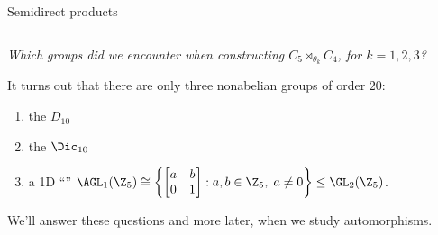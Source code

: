\documentclass[8pt, handout]{beamer}
\newcommand{\Pause}{}
\begin{document}
\begin{frame}{Semidirect products}
\begin{columns}
  \end{columns}

  \vspace{8mm}\Pause
  

  \emph{Which groups did we encounter when constructing
    $C_5\rtimes_{\theta_k}\!C_4$, for $k=1,2,3$?}
  
  \bigskip\Pause
  
  It turns out that there are only three nonabelian groups of order
  $20$: \smallskip
  \begin{enumerate}
  \item the  $D_{10}$ \smallskip\Pause
  \item the  $\Dic_{10}$ \Pause
  \item a 1D ``''
    $\AGL_1(\Z_5)\cong\left\{\begin{bmatrix}a&b\\0&1\end{bmatrix}
    :a,b\in\Z_5,\;a\neq 0\right\}\leq\GL_2(\Z_5)$.    
  \end{enumerate}
  
  \medskip\Pause
  
  We'll answer these questions and more later, when we study automorphisms. 
  
\end{frame}

\end{document}
